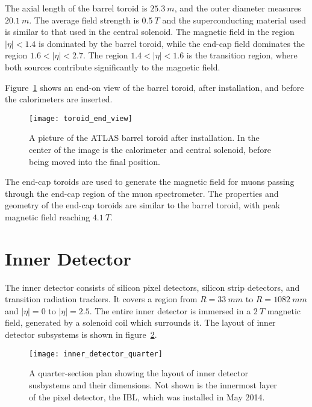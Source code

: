 The axial length of the barrel toroid is $25.3~m$, and the outer diameter measures $20.1~m$.
The average field strength is $0.5~T$ and the superconducting material used is similar to that used in the
central solenoid\cite{atlas-detector-2008}.
The magnetic field in the region $|\eta|<1.4$ is dominated by the barrel toroid,
while the end-cap field dominates the region $1.6 < |\eta| < 2.7$.
The region $1.4 < |\eta| < 1.6$ is the transition region, where both sources contribute significantly to the magnetic field.

Figure~\ref{fig:toroid_end_view} shows an end-on view of the barrel toroid, after installation,
and before the calorimeters are inserted.

\begin{figure}[h]
\texttt{[image: toroid\_end\_view]}
\caption{A picture of the ATLAS barrel toroid after installation. In
  the center of the image is the calorimeter and central solenoid,
  before being moved into the final position.}
\label{fig:toroid_end_view}
\end{figure}

The end-cap toroids are used to generate the magnetic field for muons passing through the end-cap region of the muon spectrometer.
The properties and geometry of the end-cap toroids are similar to the barrel toroid,
with peak magnetic field reaching $4.1~T$\cite{atlas-detector-2008}.

\section{Inner Detector}\label{sec:inner_detector}
The inner detector consists of silicon pixel detectors, silicon strip detectors, and transition radiation trackers.
It covers a region from $R = 33~mm$ to $R = 1082~mm$ and $|\eta| = 0$ to $|\eta| = 2.5$.
The entire inner detector is immersed in a $2~T$ magnetic field, generated by a
solenoid coil which surrounds it.\cite{atlas-detector-2008}
The layout of inner detector subsystems is shown in figure~\ref{fig:inner_detector_quarter}.

\begin{figure}[h]
\texttt{[image: inner\_detector\_quarter]}
\caption{A quarter-section plan showing the layout of inner detector susbystems and their dimensions.
Not shown is the innermost layer of the pixel detector, the IBL, which was installed in May 2014.}
\label{fig:inner_detector_quarter}
\end{figure}

